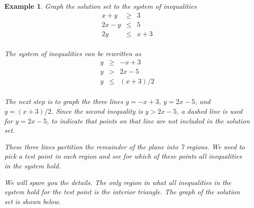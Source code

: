 \documentclass[11pt]{book}               %
\newtheorem{example}{Example}
\begin{document}
\begin{example}
Graph the solution set to the system of inequalities
\begin{eqnarray*}
x + y &\geq& 3\\
2x - y &\leq& 5\\
2y &\leq& x + 3\\
\end{eqnarray*}

\normalfont
The system of inequalities van be rewritten as
\begin{eqnarray*}
y &\geq& -x + 3\\
y &>& 2x - 5\\
y &\leq& (x + 3)/2\\
\end{eqnarray*}

The next step is to graph the three lines $y = -x + 3$, $y = 2x-5$, and $y = (x + 3)/2$.
Since the second inequality is $y > 2x - 5$, a dashed line is used for $y = 2x-5$, to indicate that points on that line are not included in the solution set.

\begin{center}
\end{center}

These three lines partition the remainder of the plane into 7 regions.
We need to pick a test point in each region and see for which of these points
all inequalities in the system hold.  

We will spare you the details.  The only region in what all inequalities in 
the system hold for the test point is the interior triangle.
The graph of the solution set is shown below.


\end{example}
\end{document}

